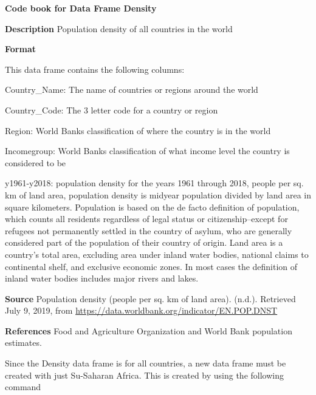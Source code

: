 \documentclass[
]{book}
\newenvironment{Shaded}{\begin{snugshade}}{\end{snugshade}}
\newcommand{\KeywordTok}[1]{\textcolor[rgb]{0.13,0.29,0.53}{\textbf{#1}}}
\newcommand{\NormalTok}[1]{#1}
\newcommand{\OperatorTok}[1]{\textcolor[rgb]{0.81,0.36,0.00}{\textbf{#1}}}
\newcommand{\StringTok}[1]{\textcolor[rgb]{0.31,0.60,0.02}{#1}}
\begin{document}
\textbf{Code book for Data Frame Density}

\textbf{Description}
Population density of all countries in the world

\textbf{Format}

This data frame contains the following columns:

Country\_Name: The name of countries or regions around the world

Country\_Code: The 3 letter code for a country or region

Region: World Banks classification of where the country is in the world

Incomegroup: World Banks classification of what income level the country is considered to be

y1961-y2018: population density for the years 1961 through 2018, people per sq. km of land area, population density is midyear population divided by land area in square kilometers. Population is based on the de facto definition of population, which counts all residents regardless of legal status or citizenship--except for refugees not permanently settled in the country of asylum, who are generally considered part of the population of their country of origin. Land area is a country's total area, excluding area under inland water bodies, national claims to continental shelf, and exclusive economic zones. In most cases the definition of inland water bodies includes major rivers and lakes.

\textbf{Source}
Population density (people per sq. km of land area). (n.d.). Retrieved July 9, 2019, from \url{https://data.worldbank.org/indicator/EN.POP.DNST}

\textbf{References}
Food and Agriculture Organization and World Bank population estimates.

Since the Density data frame is for all countries, a new data frame must be created with just Su-Saharan Africa. This is created by using the following command

\begin{Shaded}
\end{Shaded}
\end{document}
